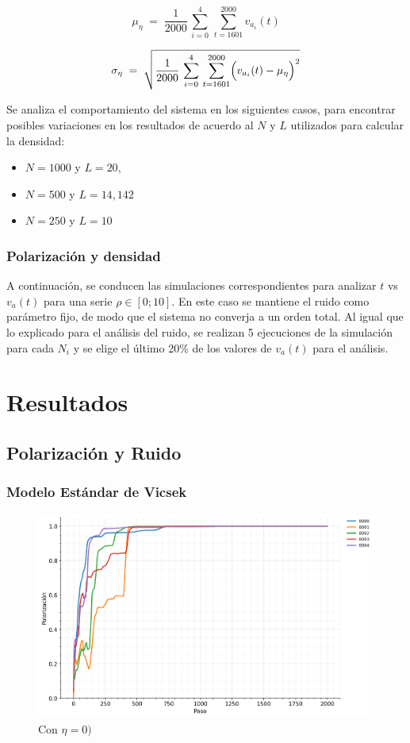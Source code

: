 \documentclass{article}
\begin{document}
\[
\mu_{\eta} \;=\; \frac{1}{2000}\,\sum_{i=0}^{4}\,\sum_{t=1601}^{2000} v_{a_i}(t)
\]

\[
\sigma_{\eta} \;=\; \sqrt{\frac{1}{2000}\,\sum_{i=0}^{4}\,\sum_{t=1601}^{2000}\Bigl(v_{a_i}(t)-\mu_{\eta}\Bigr)^2}
\]


Se analiza el comportamiento del sistema en los siguientes casos, para encontrar posibles variaciones en los resultados de acuerdo al \(N\) y \(L\) utilizados para calcular la densidad:
\begin{itemize}
    \item \(N=1000\) y \(L=20\),
    \item \(N=500\) y \(L=14,142\)
    \item \(N=250\) y \(L=10\)
\end{itemize}

\subsubsection{Polarización y densidad}
A continuación, se conducen las simulaciones correspondientes para analizar   \(t\) vs \(v_a(t)\) para una serie  \(\rho\in [0;10]\). En este caso se mantiene el ruido como parámetro fijo, de modo que el sistema no converja a un orden total.
Al igual que lo explicado para el análisis del ruido, se realizan 5 ejecuciones de la simulación para cada \(N_i\) y se elige el último 20\% de los valores de \(v_a(t)\) para el análisis.

\section{Resultados}
\subsection{Polarización y Ruido}
\subsubsection{Modelo Estándar de Vicsek}

\begin{figure}
    \centering
    \includegraphics[width=1\linewidth]{noise_0_SVM.png}
    \caption{Con \(\eta = 0)\)}
    \label{Fig. 1:}
\end{figure}
\end{document}
